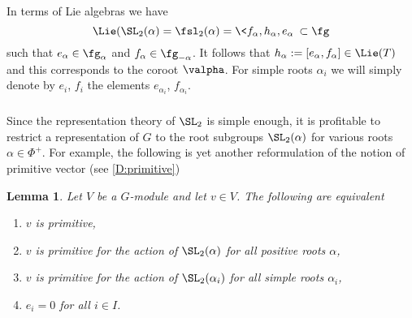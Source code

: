 \documentclass[reqno, 10pt]{amsart}
\theoremstyle{plain}
\newtheorem{lemma}[proposition]{Lemma}
\theoremstyle{definition}
\numberwithin{equation}{section}%
\begin{document}
In terms of Lie algebras we have 
\[\Lie(\SL_2(\alpha)=\fsl_2(\alpha)=\<f_\alpha,h_\alpha,e_\alpha\>\subset \fg\] 
such that $e_\alpha\in\fg_\alpha$ and $f_\alpha\in \fg_{-\alpha}$.
It follows that $h_\alpha :=[e_\alpha,f_\alpha]\in\Lie(T)$ and this corresponds to the coroot $\valpha$.
For simple roots $\alpha_i$ we will simply denote by $e_i$, $f_i$ the elements $e_{\alpha_i}$, $f_{\alpha_i}$.

\subsubsection{}Since the representation theory of $\SL_2$ is simple enough, it is profitable to restrict a representation of $G$ to the root subgroups $\SL_2(\alpha)$ for various roots $\alpha\in\Phi^+$.
For example, the following is yet another reformulation of the notion of primitive vector (see \cref{D:primitive})
\begin{lemma}\label{L:another equiv primitive}
	Let $V$ be a $G$-module and let $v\in V$. The following are equivalent
	\begin{enumerate}
		\item $v$ is primitive,
		\item $v$ is primitive for the action of $\SL_2(\alpha)$ for all positive roots $\alpha$,
		\item $v$ is primitive for the action of $\SL_2(\alpha_i)$ for all simple roots $\alpha_i$,
		\item $e_i=0$ for all $i\in I$.
	\end{enumerate}
\end{lemma}
\end{document}
